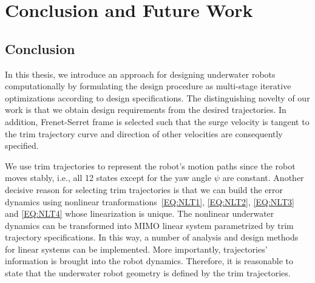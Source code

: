 \chapter{Conclusion and Future Work}
\section{Conclusion}

In this thesis, we introduce an approach for designing underwater robots computationally by formulating the design procedure as multi-stage iterative optimizations according to design specifications. The distinguishing novelty of our work is that we obtain design requirements from the desired trajectories. In addition, Frenet-Serret frame is selected such that the surge velocity is tangent to the trim trajectory curve and direction of other velocities are consequently specified. 

We use trim trajectories to represent the robot's motion paths since the robot moves stably, i.e., all 12 states except for the yaw angle $\psi$ are constant. 
Another decisive reason for selecting trim trajectories is that we can build the error dynamics using nonlinear tranformations~\ref{EQ:NLT1}, \ref{EQ:NLT2}, \ref{EQ:NLT3} and \ref{EQ:NLT4} whose linearization is unique. The nonlinear underwater dynamics can be transformed into MIMO linear system parametrized by trim trajectory specifications. In this way, a number of analysis and design methods for linear systems can be implemented. More importantly, trajectories' information is brought into the robot dynamics. Therefore, it is reasonable to state that the underwater robot geometry is defined by the trim trajectories. 


